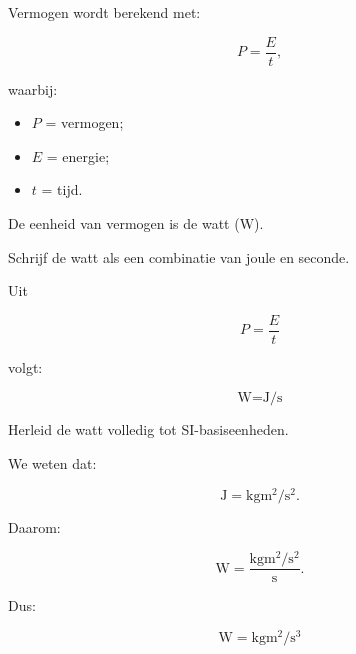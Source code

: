 \documentclass{ximera}
\begin{document}
\begin{oefening}{\oefB}

Vermogen wordt berekend met:

\[
P = \frac{E}{t},
\]

waarbij:

\begin{itemize}
    \item $P$ = vermogen;
    \item $E$ = energie;
    \item $t$ = tijd.
\end{itemize}

De eenheid van vermogen is de watt ($\si{\watt}$).

\begin{question}
Schrijf de watt als een combinatie van joule en seconde.

\begin{oplossing}
Uit

\[
P = \frac{E}{t}
\]

volgt:

\[
\boxed{
\si{\watt}
=
\si{\joule\per\second}
}
\]
\end{oplossing}
\end{question}


\begin{question}
Herleid de watt volledig tot SI-basiseenheden.

\begin{oplossing}
We weten dat:

\[
\si{\joule}
=
\si{\kilogram\meter\squared\per\second\squared}.
\]

Daarom:

\[
\si{\watt}
=
\frac{
\si{\kilogram\meter\squared\per\second\squared}
}{
\si{\second}
}.
\]

Dus:

\[
\boxed{
\si{\watt}
=
\si{\kilogram\meter\squared\per\second\cubed}
}
\]
\end{oplossing}
\end{question}

\end{oefening}
\end{document}
